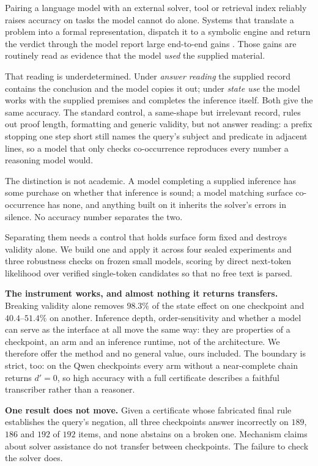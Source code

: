 \documentclass[10pt,twocolumn]{article}
\begin{document}
Pairing a language model with an external solver, tool or retrieval index
reliably raises accuracy on tasks the model cannot do alone. Systems that
translate a problem into a formal representation, dispatch it to a symbolic
engine and return the verdict through the model report large end-to-end gains
\citep{pan2023logiclm,olausson2023linc,ye2023satlm,gao2022pal,schick2023toolformer,yang2023leandojo,lewis2020retrievalaugmented}.
Those gains are routinely read as evidence that the model \emph{used} the
supplied material.

That reading is underdetermined. Under \emph{answer reading} the supplied record
contains the conclusion and the model copies it out; under \emph{state use} the
model works with the supplied premises and completes the inference itself. Both
give the same accuracy. The standard control, a same-shape but irrelevant
record, rules out proof length, formatting and generic validity, but not answer
reading: a prefix stopping one step short still names the query's subject and
predicate in adjacent lines, so a model that only checks co-occurrence
reproduces every number a reasoning model would.

The distinction is not academic. A model completing a supplied inference has
some purchase on whether that inference is sound; a model matching surface
co-occurrence has none, and anything built on it inherits the solver's errors in
silence. No accuracy number separates the two.

Separating them needs a control that holds surface form fixed and destroys
validity alone. We build one and apply it across four sealed experiments and three
robustness checks on frozen small models, scoring by direct next-token
likelihood over verified single-token candidates so that no free text is parsed.

\textbf{The instrument works, and almost nothing it returns transfers.}
Breaking validity alone removes $98.3\%$ of the state effect on one checkpoint
and $40.4$--$51.4\%$ on another. Inference depth, order-sensitivity and whether
a model can serve as the interface at all move the same way: they are properties
of a checkpoint, an arm and an inference runtime, not of the architecture. We
therefore offer the method and no general value, ours included. The boundary is
strict, too: on the Qwen checkpoints every arm without a near-complete chain
returns $d' = 0$, so high accuracy with a full certificate describes a faithful
transcriber rather than a reasoner.

\textbf{One result does not move.} Given a certificate whose fabricated final
rule establishes the query's negation, all three checkpoints answer incorrectly
on $189$, $186$ and $192$ of $192$ items, and none abstains on a broken one.
Mechanism claims about solver assistance do not transfer between checkpoints.
The failure to check the solver does.
\end{document}
